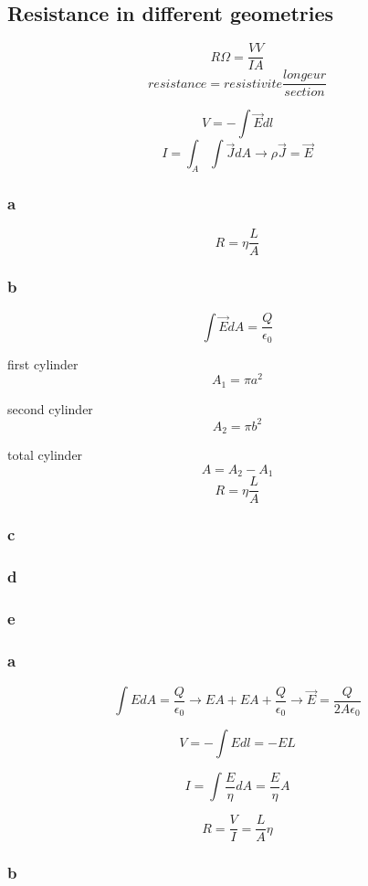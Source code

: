 \subsection{Resistance in different geometries}

\[R \unit{\Omega} = \frac{V \unit{V}}{I \unit{A}}\]
\[ resistance = resistivite \frac{longeur}{section} \]

\[
	V = - \int \vec{E} dl
\]
\[
	I = \int_A \int \vec{J} dA \to \rho \vec{J} = \vec{E}
\]

\subsubsection{a}
\[
	R = \eta \frac{L}{A}
\]

\subsubsection{b}
\[
	\int \vec{E} dA = \frac{Q}{\epsilon_0}
\]

first cylinder
\[
	A_1 = \pi a^2
\]

second cylinder
\[
	A_2 = \pi b^2
\]

total cylinder
\[
	A = A_2 - A_1
\]
\[
	R = \eta \frac{L}{A}
\]

\subsubsection{c}

\subsubsection{d}

\subsubsection{e}


\subsubsection{a}

\[
	\int E dA = \frac{Q}{\epsilon_0}
	\to E A + E A + \frac{Q}{\epsilon_0}
	\to \vec{E} = \frac{Q}{2 A \epsilon_0}
\]

\[
	V = - \int E dl = - E L
\]

\[
	I = \int \frac{E}{\eta} dA = \frac{E}{\eta} A
\]

\[
	R = \frac{V}{I} = \frac{L}{A} \eta
\]

\subsubsection{b}

